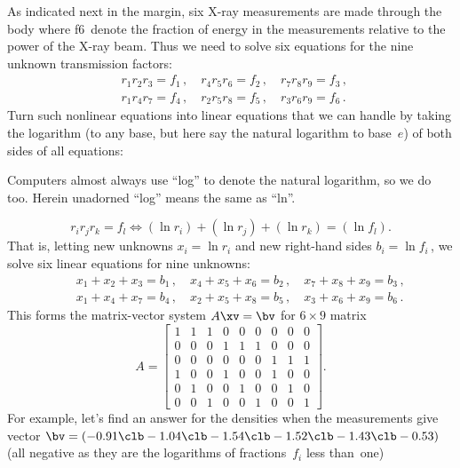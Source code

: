 \begin{example}
As indicated next in the margin, six X-ray measurements are made through the body where \hlist f6\ denote the fraction of energy in the measurements relative to the power of the X-ray beam.
Thus we need to solve six equations for the nine unknown transmission factors:
\begin{eqnarray*}
&&
r_1r_2r_3=f_1\,,\quad
r_4r_5r_6=f_2\,,\quad
r_7r_8r_9=f_3\,,\quad
\\&&
r_1r_4r_7=f_4\,,\quad
r_2r_5r_8=f_5\,,\quad
r_3r_6r_9=f_6\,.\quad
\end{eqnarray*}
%
Turn such nonlinear equations into linear equations that we can handle by taking the logarithm (to any base, but here say the natural logarithm to base~\(e\)) of both sides of all equations:
\begin{aside}
Computers almost always use ``log'' to denote the natural logarithm, so we do too.  Herein unadorned ``log'' means the same as ``ln''.
\end{aside}
\begin{equation*}
r_ir_jr_k=f_l \iff (\ln r_i)+(\ln r_j)+(\ln r_k)=(\ln f_l).
\end{equation*}
That is, letting new unknowns \(x_i=\ln r_i\) and new right-hand sides \(b_i=\ln f_i\)\,, we solve six linear equations for nine unknowns:
\begin{eqnarray*}&&
x_1+x_2+x_3=b_1\,,\quad
x_4+x_5+x_6=b_2\,,\quad
x_7+x_8+x_9=b_3\,,
\\&&
x_1+x_4+x_7=b_4\,,\quad
x_2+x_5+x_8=b_5\,,\quad
x_3+x_6+x_9=b_6\,.
\end{eqnarray*}
This forms the matrix-vector system \(A\xv=\bv\) for \(6\times9\) matrix
\begin{equation*}
A=\begin{bmatrix} 
 1&1&1&0&0&0&0&0&0 \\
 0&0&0&1&1&1&0&0&0 \\
 0&0&0&0&0&0&1&1&1 \\
 1&0&0&1&0&0&1&0&0 \\
 0&1&0&0&1&0&0&1&0 \\
 0&0&1&0&0&1&0&0&1 \end{bmatrix}.
\end{equation*}
For example, let's find an answer for the densities when the measurements give vector \(\bv=(-0.91\clb -1.04\clb -1.54\clb -1.52\clb -1.43\clb -0.53)\) (all negative as they are the logarithms of fractions~\(f_i\) less than~one)
\setbox\ajrqrbox\hbox{\qrcode{%
A=[1 1 1 0 0 0 0 0 0 
 0 0 0 1 1 1 0 0 0 
 0 0 0 0 0 0 1 1 1
 1 0 0 1 0 0 1 0 0 
}}
\end{example}
